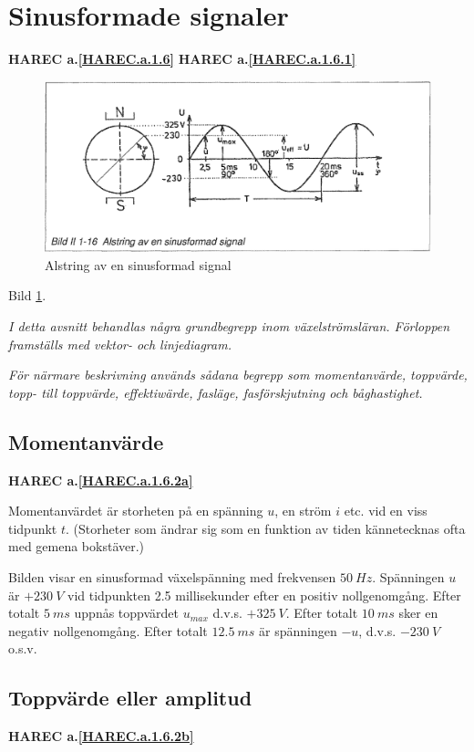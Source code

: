 \section{Sinusformade signaler}
\textbf{HAREC a.\ref{HAREC.a.1.6}\label{myHAREC.a.1.6}}
\textbf{HAREC a.\ref{HAREC.a.1.6.1}\label{myHAREC.a.1.6.1}}

\begin{figure}[h]
\includegraphics[width=\textwidth]{images/bild_2_1-16}
\caption{Alstring av en sinusformad signal}
\label{fig:BildII1-16}
\end{figure}

Bild \ref{fig:BildII1-16}.

\emph{I detta avsnitt behandlas några grundbegrepp inom växelströmsläran.
Förloppen framställs med vektor- och linjediagram.}

\emph{För närmare beskrivning används sådana begrepp som momentanvärde,
toppvärde, topp- till toppvärde, effektiwärde, fasläge, fasförskjutning och
båghastighet.}

\subsection{Momentanvärde}
\textbf{HAREC a.\ref{HAREC.a.1.6.2a}\label{myHAREC.a.1.6.2a}}

Momentanvärdet är storheten på en spänning \(u\), en ström \(i\) etc. vid en
viss tidpunkt \(t\). (Storheter som ändrar sig som en funktion av tiden
kännetecknas ofta med gemena bokstäver.)

Bilden visar en sinusformad växelspänning med frekvensen \(50\ Hz\). Spänningen
\(u\) är \(+230\ V\) vid tidpunkten 2.5 millisekunder efter en positiv
nollgenomgång. Efter totalt \(5\ ms\) uppnås toppvärdet \(u_{max}\) d.v.s.
\(+325\ V\). Efter totalt \(10\ ms\) sker en negativ nollgenomgång. Efter
totalt \(12.5\ ms\) är spänningen \(-u\), d.v.s. \(-230\ V\) o.s.v.

\subsection{Toppvärde eller amplitud}
\textbf{HAREC a.\ref{HAREC.a.1.6.2b}\label{myHAREC.a.1.6.2b}}

